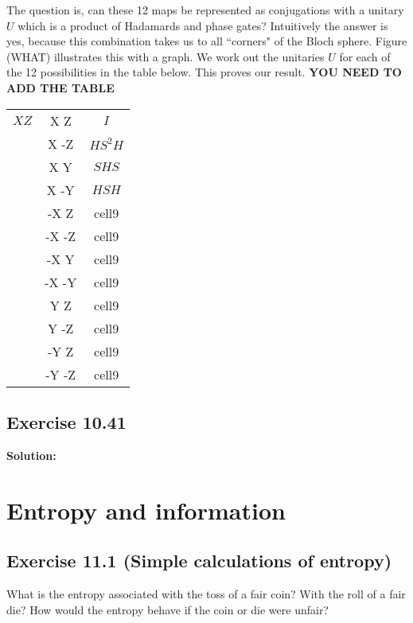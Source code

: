 \documentclass{book}
\begin{document}
    The question is, can these 12 maps be represented as conjugations with a unitary $U$ which is a product of Hadamards and phase gates? Intuitively the answer is yes, because this combination takes us to all ``corners" of the Bloch sphere. Figure (WHAT) illustrates this with a graph. We work out the unitaries $U$ for each of the 12 possibilities in the table below. This proves our result. \textbf{YOU NEED TO ADD THE TABLE}
    
    \begin{center}
    \begin{tabular}{ |c|c|c| } 
    \hline
        $X Z$& X Z & $I$ \\ 
        & X -Z & $HS^2H$ \\ 
        & X Y & $SHS$ \\
        & X -Y & $HSH$ \\
        & -X Z & cell9 \\
        & -X -Z & cell9 \\
        & -X Y & cell9 \\
        & -X -Y & cell9 \\
        & Y Z & cell9 \\
        & Y -Z & cell9 \\
        & -Y Z & cell9 \\
        & -Y -Z & cell9 \\
    \hline
    \end{tabular}
    \end{center}
    
\section*{Exercise 10.41}
    \textbf{Solution:}
    
\chapter{Entropy and information}

\section*{Exercise 11.1 (Simple calculations of entropy)}
    What is the entropy associated with the toss of a fair coin? With the roll of a fair die? How would the entropy behave if the coin or die were unfair?
    
\end{document}
